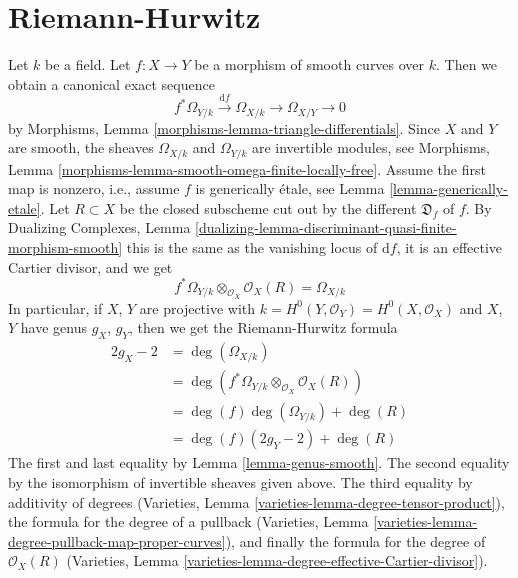 \section{Riemann-Hurwitz}
\label{section-riemann-hurewitz}

\noindent
Let $k$ be a field. Let $f : X \to Y$ be a morphism of smooth curves over $k$.
Then we obtain a canonical exact sequence
$$
f^*\Omega_{Y/k} \xrightarrow{\text{d}f} \Omega_{X/k}
\longrightarrow \Omega_{X/Y} \longrightarrow 0
$$
by Morphisms, Lemma \ref{morphisms-lemma-triangle-differentials}.
Since $X$ and $Y$ are smooth, the sheaves $\Omega_{X/k}$ and
$\Omega_{Y/k}$ are invertible modules, see
Morphisms, Lemma \ref{morphisms-lemma-smooth-omega-finite-locally-free}.
Assume the first map is nonzero, i.e., assume $f$ is generically
\'etale, see Lemma \ref{lemma-generically-etale}. Let $R \subset X$
be the closed subscheme cut out by the different $\mathfrak{D}_f$ of $f$.
By Dualizing Complexes, Lemma
\ref{dualizing-lemma-discriminant-quasi-finite-morphism-smooth}
this is the same as the vanishing locus of $\text{d}f$, it is
an effective Cartier divisor, and we get
$$
f^*\Omega_{Y/k} \otimes_{\mathcal{O}_X} \mathcal{O}_X(R) = \Omega_{X/k}
$$
In particular, if $X$, $Y$ are projective with
$k = H^0(Y, \mathcal{O}_Y) = H^0(X, \mathcal{O}_X)$
and $X$, $Y$ have genus $g_X$, $g_Y$, then we get the
Riemann-Hurwitz formula
\begin{align*}
2g_X - 2 & =
\deg(\Omega_{X/k}) \\
& =
\deg(f^*\Omega_{Y/k} \otimes_{\mathcal{O}_X} \mathcal{O}_X(R)) \\
& =
\deg(f) \deg(\Omega_{Y/k}) + \deg(R) \\
& =
\deg(f) (2g_Y - 2) + \deg(R)
\end{align*}
The first and last equality by Lemma \ref{lemma-genus-smooth}.
The second equality by the isomorphism of invertible sheaves given above.
The third equality by additivity of degrees
(Varieties, Lemma \ref{varieties-lemma-degree-tensor-product}),
the formula for the degree of a pullback
(Varieties, Lemma \ref{varieties-lemma-degree-pullback-map-proper-curves}),
and finally the formula for the degree of $\mathcal{O}_X(R)$
(Varieties, Lemma \ref{varieties-lemma-degree-effective-Cartier-divisor}).

